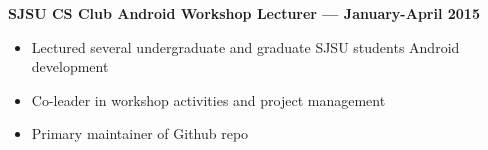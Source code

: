 \documentclass[10pt, oneside]{letter}
\begin{document}
    \textbf{SJSU CS Club Android Workshop Lecturer --- January-April 2015}
    \begin{adjustwidth}{0.2in}{0pt}
      \begin{itemize}
        \item Lectured several undergraduate and graduate SJSU students Android development
        \item Co-leader in workshop activities and project management
        \item Primary maintainer of Github repo
      \end{itemize}
    \end{adjustwidth}
\end{document}
